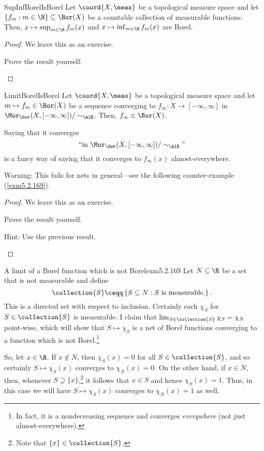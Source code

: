 \begin{prp}{}{SupInfBorelIsBorel}
Let $\coord{X,\meas}$ be a topological measure space and let $\{ f_m:m\in \N \} \subseteq \Bor (X)$ be a countable collection of measurable functions.  Then, $x\mapsto \sup _{m\in \N}f_m(x)$ and $x\mapsto \inf _{m\in \N}f_m(x)$ are Borel.
\begin{proof}
We leave this as an exercise.
\begin{exr}[breakable=false]{}{}
Prove the result yourself.
\end{exr}
\end{proof}
\end{prp}
\begin{prp}{}{LimitBorelIsBorel}
Let $\coord{X,\meas}$ be a topological measure space and let $m\mapsto f_m\in \Bor (X)$ be a sequence converging to $f_{\infty}\colon X\rightarrow [-\infty ,\infty ]$ in $\Mor _{\Set}(X,[-\infty ,\infty ])/\sim _{\AlE}$.  Then, $f_\infty \in \Bor (X)$.
\begin{rmk}
Saying that it converges
\begin{equation}
\text{``in }\Mor _{\Set}(X,[-\infty ,\infty ])/\sim _{\AlE}\text{''}
\end{equation}
is a fancy way of saying that it converges to $f_{\infty}(x)$ almost-everywhere.
\end{rmk}
\begin{wrn}
Warning:  This fails for nets in general---see the following counter-example (\cref{exm5.2.169}).
\end{wrn}
\begin{proof}
We leave this as an exercise.
\begin{exr}[breakable=false]{}{}
Prove the result yourself.
\begin{rmk}
Hint:  Use the previous result.
\end{rmk}
\end{exr}
\end{proof}
\end{prp}
\begin{exm}{A limit of a Borel function which is not Borel}{exm5.2.169}
Let $N\subseteq \R$ be a set that is not measurable and define
\begin{equation}
\collection{S}\ceqq \left\{ S\subseteq N:S\text{ is measurable.}\right\} .
\end{equation}
This is a directed set with respect to inclusion.  Certainly each $\chi _S$ for $S\in \collection{S}$ is measurable.  I claim that $\lim _{S\in \collection{S}}\chi _S=\chi _N$ point-wise, which will show that $S\mapsto \chi _S$ is a net of Borel functions converging to a function which is not Borel.\footnote{In fact, it is a nondecreasing sequence and converges \emph{everywhere} (not just almost-everywhere).}

So, let $x\in \R$.  If $x\notin N$, then $\chi _S(x)=0$ for all $S\in \collection{S}$, and so certainly $S\mapsto \chi _S(x)$ converges to $\chi _N(x)=0$.  On the other hand, if $x\in N$, then, whenever $S\supseteq \{ x\}$,\footnote{Note that $\{ x\} \in \collection{S}$.} it follows that $x\in S$ and hence $\chi _S(x)=1$.  Thus, in this case we will have $S\mapsto \chi _S(x)$ converges to $\chi _N(x)=1$ as well.
\end{exm}

